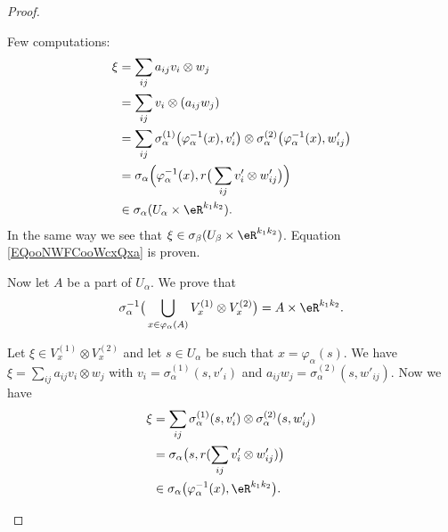 \begin{proof}
\begin{subproof}
\begin{subproof}
\begin{subproof}
				Few computations:
				\begin{subequations}
					\begin{align}
						\xi & =\sum_{ij}a_{ij}v_i\otimes w_j                                                                                                                     \\
						    & =\sum_{ij}v_i\otimes (a_{ij}w_j)                                                                                                                   \\
						    & =\sum_{ij}\sigma_{\alpha}^{(1)}\big( \varphi_{\alpha}^{-1}(x),v'_i \big)\otimes \sigma_{\alpha}^{(2)}\big( \varphi_{\alpha}^{-1}(x), w'_{ij} \big) \\
						    & =\sigma_{\alpha}\Big( \varphi_{\alpha}^{-1}(x),r\big( \sum_{ij}v'_i\otimes w'_{ij} \big) \Big)                                                     \\
						    & \in \sigma_{\alpha}(U_{\alpha}\times \eR^{k_1k_2}).
					\end{align}
				\end{subequations}
				In the same way we see that \( \xi\in \sigma_{\beta}(U_{\beta}\times \eR^{k_1k_2})\). Equation \eqref{EQooNWFCooWcxQxa} is proven.
			\end{subproof}
			Now let \( A\) be a part of \( U_{\alpha}\). We prove that
			\begin{equation}		\label{EQooJCUAooYxMMvC}
				\sigma_{\alpha}^{-1}\big( \bigcup_{x\in \varphi_{\alpha}(A)}V_x^{(1)}\otimes V_x^{(2)} \big)=A\times \eR^{k_1k_2}.
			\end{equation}
			\begin{subproof}
				Let \( \xi\in V_x^{(1)}\otimes V_x^{(2)}\) and let \( s\in U_{\alpha}\) be such that \( x=\varphi_{\alpha}(s)\). We have \( \xi=\sum_{ij}a_{ij} v_i\otimes w_j\) with \( v_i= \sigma_{\alpha}^{(1)}(s,v'_i)\) and \( a_{ij}w_j=\sigma_{\alpha}^{(2)}(s,w'_{ij})\). Now we have
				\begin{subequations}
					\begin{align}
						\xi & =\sum_{ij}\sigma_{\alpha}^{(1)}(s,v'_i)\otimes \sigma_{\alpha}^{(2)}(s,w_{ij}') \\
						    & =\sigma_{\alpha}\big( s,r(\sum_{ij}v'_i\otimes w'_{ij}) \big)                   \\
						    & \in \sigma_{\alpha}\big( \varphi_{\alpha}^{-1}(x),\eR^{k_1k_2} \big).
					\end{align}

\end{subequations}
\end{subproof}
\end{subproof}
\end{subproof}
\end{proof}
